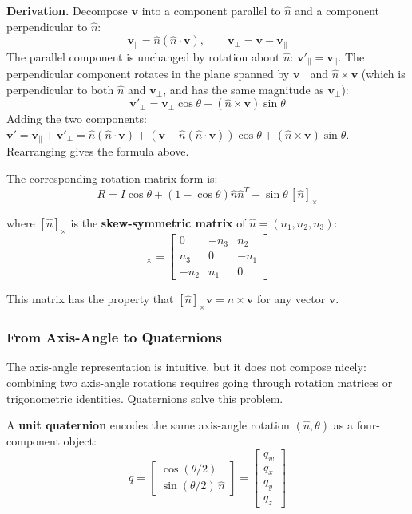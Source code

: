\textbf{Derivation.} Decompose $\mathbf{v}$ into a component parallel to $\hat{n}$ and a component perpendicular to $\hat{n}$:
\[
\mathbf{v}_\parallel = \hat{n}(\hat{n} \cdot \mathbf{v}), \qquad \mathbf{v}_\perp = \mathbf{v} - \mathbf{v}_\parallel
\]
The parallel component is unchanged by rotation about $\hat{n}$: $\mathbf{v}'_\parallel = \mathbf{v}_\parallel$. The perpendicular component rotates in the plane spanned by $\mathbf{v}_\perp$ and $\hat{n} \times \mathbf{v}$ (which is perpendicular to both $\hat{n}$ and $\mathbf{v}_\perp$, and has the same magnitude as $\mathbf{v}_\perp$):
\[
\mathbf{v}'_\perp = \mathbf{v}_\perp \cos\theta + (\hat{n} \times \mathbf{v}) \sin\theta
\]
Adding the two components: $\mathbf{v}' = \mathbf{v}_\parallel + \mathbf{v}'_\perp = \hat{n}(\hat{n} \cdot \mathbf{v}) + (\mathbf{v} - \hat{n}(\hat{n} \cdot \mathbf{v}))\cos\theta + (\hat{n} \times \mathbf{v})\sin\theta$. Rearranging gives the formula above.

The corresponding rotation matrix form is:
\begin{equation}
R = I \cos\theta + (1 - \cos\theta) \hat{n}\hat{n}^T + \sin\theta \, [\hat{n}]_\times
\end{equation}

where $[\hat{n}]_\times$ is the \textbf{skew-symmetric matrix} of $\hat{n} = (n_1, n_2, n_3)$:
\begin{equation}
[\hat{n}]_\times = \begin{bmatrix} 0 & -n_3 & n_2 \\ n_3 & 0 & -n_1 \\ -n_2 & n_1 & 0 \end{bmatrix}
\end{equation}

This matrix has the property that $[\hat{n}]_\times \mathbf{v} = \hat{n} \times \mathbf{v}$ for any vector $\mathbf{v}$.

\subsubsection{From Axis-Angle to Quaternions}

The axis-angle representation is intuitive, but it does not compose nicely: combining two axis-angle rotations requires going through rotation matrices or trigonometric identities. Quaternions solve this problem.

A \textbf{unit quaternion} encodes the same axis-angle rotation $(\hat{n}, \theta)$ as a four-component object:
\begin{equation}
q = \begin{bmatrix} \cos(\theta/2) \\ \sin(\theta/2) \, \hat{n} \end{bmatrix}
= \begin{bmatrix} q_w \\ q_x \\ q_y \\ q_z \end{bmatrix}
\end{equation}

